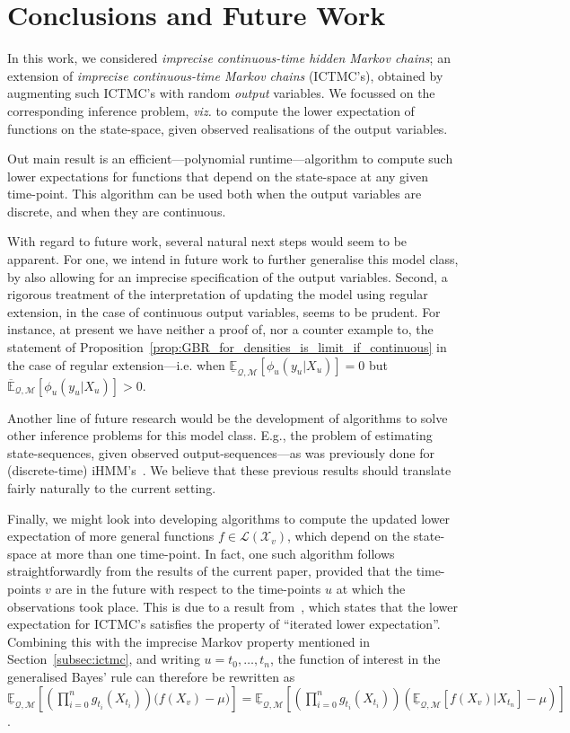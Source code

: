 \documentclass[twoside,11pt]{article}
\newcommand{\states}{\mathcal{X}}
\newcommand{\lexp}{\underline{\mathbb{E}}_{\rateset,\mathcal{M}}}
\newcommand{\uexp}{\overline{\mathbb{E}}_{\rateset,\mathcal{M}}}
\newcommand{\gambles}{\mathcal{L}}
\newcommand{\rateset}{\mathcal{Q}}
\begin{document}
\section{Conclusions and Future Work}\label{sec:conclusions}

In this work, we considered \emph{imprecise continuous-time hidden Markov chains}; an extension of \emph{imprecise continuous-time Markov chains} (ICTMC's), obtained by augmenting such ICTMC's with random \emph{output} variables. We focussed on the corresponding inference problem, \emph{viz.} to compute the lower expectation of functions on the state-space, given observed realisations of the output variables. 

Out main result is an efficient---polynomial runtime---algorithm to compute such lower expectations for functions that depend on the state-space at any given time-point. This algorithm can be used both when the output variables are discrete, and when they are continuous.

With regard to future work, several natural next steps would seem to be apparent. For one, we intend in future work to further generalise this model class, by also allowing for an imprecise specification of the output variables. Second, a rigorous treatment of the interpretation of updating the model using regular extension, in the case of continuous output variables, seems to be prudent. For instance, at present we have neither a proof of, nor a counter example to, the statement of Proposition~\ref{prop:GBR_for_densities_is_limit_if_continuous} in the case of regular extension---i.e. when $\lexp[\phi_u(y_u\vert X_u)]=0$ but $\uexp[\phi_u(y_u\vert X_u)]>0$.

Another line of future research would be the development of algorithms to solve other inference problems for this model class. E.g., the problem of estimating state-sequences, given observed output-sequences---as was previously done for (discrete-time) iHMM's~\citep{DeBock:2014ts}. We believe that these previous results should translate fairly naturally to the current setting.

Finally, we might look into developing algorithms to compute the updated lower expectation of more general functions $f\in\gambles(\states_v)$, which depend on the state-space at more than one time-point. In fact, one such algorithm follows straightforwardly from the results of the current paper, provided that the time-points $v$ are in the future with respect to the time-points $u$ at which the observations took place. This is due to a result from~\cite{krak2016ictmc}, which states that the lower expectation for ICTMC's satisfies the property of ``iterated lower expectation''. Combining this with the imprecise Markov property mentioned in Section~\ref{subsec:ictmc}, and writing $u=t_0,\ldots,t_n$, the function of interest in the generalised Bayes' rule can therefore be rewritten as
$\lexp\left[\left(\prod_{i=0}^n g_{t_i}(X_{t_i})\right)\bigl(f(X_v) - \mu\bigr)\right] = \lexp\left[\left(\prod_{i=0}^n g_{t_i}(X_{t_i})\right)\left(\lexp[f(X_v)\vert X_{t_n}] - \mu\right)\right]$.
\end{document}
